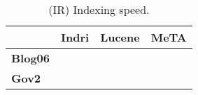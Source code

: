 \begin{table}[t]
\centering
{\small
\begin{tabular}{|l|r|r|r|}
        \hline & \textbf{Indri} & \textbf{Lucene} & \textbf{MeTA} \\
        \hline
        \textbf{Blog06} & & & \\
        \textbf{Gov2}    & & & \\
        \hline
\end{tabular}
\caption{(IR) Indexing speed.}
}
\label{table:ir-indexing}
\end{table}
